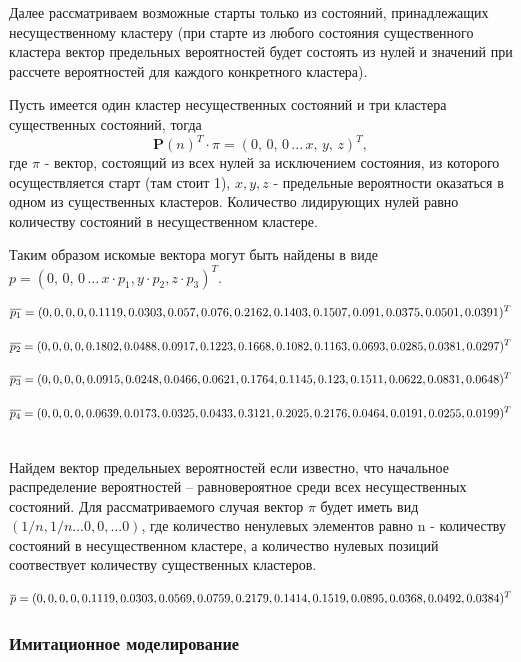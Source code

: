 Далее рассматриваем возможные старты только из состояний, принадлежащих несущественному кластеру
(при старте из любого состояния существенного кластера вектор предельных вероятностей будет состоять из нулей и значений
при рассчете вероятностей для каждого конкретного кластера).

Пусть имеется один кластер несущественных состояний и три кластера существенных состояний, тогда
$$
    \mathbf{P} (n)^T \cdot \pi = (0, \, 0, \, 0 \,...\,x,\, y,\, z)^T,
$$
где $\pi$ - вектор, состоящий из всех нулей за исключением состояния, из которого осуществляется старт (там стоит 1),
$x, y, z$ - предельные вероятности оказаться в одном из существенных кластеров.
Количество лидирующих нулей равно количеству состояний в несущественном кластере.

Таким образом искомые вектора могут быть найдены в виде 
$p = (0,\, 0,\, 0\,...\,x \cdot p_1, y\cdot p_2, z\cdot p_3)^T$.

    \[\overline{p_1} = (0, 0, 0, 0, 0.1119, 0.0303, 0.057, 0.076, 0.2162, 0.1403, 0.1507, 0.091, 0.0375, 0.0501, 0.0391 \\
)^T\]

    \[\overline{p_2} = (0, 0, 0, 0, 0.1802, 0.0488, 0.0917, 0.1223, 0.1668, 0.1082, 0.1163, 0.0693, 0.0285, 0.0381, 0.0297 \\
)^T\]

    \[\overline{p_3} = (0, 0, 0, 0, 0.0915, 0.0248, 0.0466, 0.0621, 0.1764, 0.1145, 0.123, 0.1511, 0.0622, 0.0831, 0.0648 \\
)^T\]

    \[\overline{p_4} = (0, 0, 0, 0, 0.0639, 0.0173, 0.0325, 0.0433, 0.3121, 0.2025, 0.2176, 0.0464, 0.0191, 0.0255, 0.0199 \\
)^T\]

~\\

Найдем вектор предельныех вероятностей если известно, что начальное распределение вероятностей – равновероятное среди
всех несущественных состояний.
Для рассматриваемого случая вектор $\pi$ будет иметь вид $(1/n, 1/n...0, 0,...0)$,
где количество ненулевых элементов равно n - количеству состояний в несущественном кластере, а количество нулевых
позиций соотвествует количеству существенных кластеров.

\[ \overline{p} = (0, 0, 0, 0, 0.1119, 0.0303, 0.0569, 0.0759, 0.2179, 0.1414, 0.1519, 0.0895, 0.0368, 0.0492, 0.0384 \\
)^T\]


\subsubsection{Имитационное моделирование}

